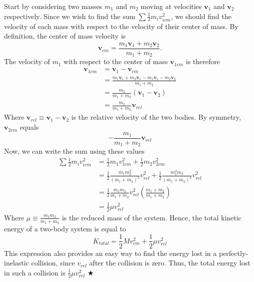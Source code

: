 \noindent Start by considering two masses $m_1$ and $m_2$ moving at velocities $\mathbf{v}_1$ and $\mathbf{v}_2$ respectively. Since we wish to find the sum $\sum\frac12 m_i v_{icm}^2$, we should find the velocity of each mass with respect to the velocity of their center of mass. By definition, the center of mass velocity is
\begin{equation*}
    \mathbf{v}_{cm} = \frac{m_1\mathbf{v}_1 + m_2\mathbf{v}_2}{m_1 + m_2}.
\end{equation*}
\noindent The velocity of $m_1$ with respect to the center of mass $\mathbf{v}_{1cm}$ is therefore
\begin{align*}
    \mathbf{v}_{1cm} &= \mathbf{v}_1 - \mathbf{v}_{cm} \\
    &= \frac{m_1\mathbf{v}_1 + m_2\mathbf{v}_1 - m_1\mathbf{v}_1 - m_2\mathbf{v}_2}{m_1 + m_2} \\
    &= \frac{m_2}{m_1 + m_2}\left(\mathbf{v}_1 - \mathbf{v}_2\right) \\
    &= \frac{m_2}{m_1 + m_2}\mathbf{v}_{rel}
\end{align*}
\noindent Where $\mathbf{v}_{rel} \equiv \mathbf{v}_1 - \mathbf{v}_2$ is the relative velocity of the two bodies. By symmetry, $\mathbf{v}_{2cm}$ equals
\begin{equation*}
    -\frac{m_1}{m_1 + m_2}\mathbf{v}_{rel}
\end{equation*}
\noindent Now, we can write the sum using these values
\begin{align*}
    \sum\frac12 m_i v_{icm}^2 &= \frac12 m_1 v_{1cm}^2 + \frac12 m_2 v_{2cm}^2 \\
    &= \frac12 \frac{m_1 m_2^2}{(m_1 + m_2)^2}v_{rel}^2 + \frac12 \frac{m_1^2 m_2}{(m_1 + m_2)^2}v_{rel}^2 \\
    &= \frac12 \frac{m_1m_2}{m_1+m_2} v_{rel}^2 \left(\frac{m_1+m_2}{m_1+m_2}\right) \\
    &= \frac12 \mu v_{rel}^2
\end{align*}
\noindent Where $\mu \equiv \frac{m_1m_2}{m_1+m_2}$ is the reduced mass of the system. Hence, the total kinetic energy of a two-body system is equal to 
\begin{equation}
    \boxed{K_{total} = \frac12 M v_{cm}^2 + \frac12 \mu v_{rel}^2}
\end{equation}
\noindent This expression also provides an easy way to find the energy lost in a perfectly-inelastic collision, since $v_{rel}$ after the collision is zero. Thus, the total energy lost in such a collision is $\frac12 \mu v_{rel}^2$ $\bigstar$

